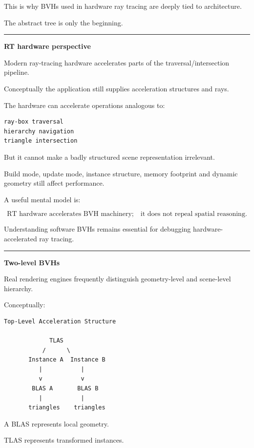 This is why BVHs used in hardware ray tracing are deeply tied to architecture.

The abstract tree is only the beginning.

\begin{center}\rule{0.5\linewidth}{0.5pt}\end{center}

\textbf{RT hardware perspective}

Modern ray-tracing hardware accelerates parts of the traversal/intersection pipeline.

Conceptually the application still supplies acceleration structures and rays.

The hardware can accelerate operations analogous to:

\begin{verbatim}
ray-box traversal
hierarchy navigation
triangle intersection
\end{verbatim}

But it cannot make a badly structured scene representation irrelevant.

Build mode, update mode, instance structure, memory footprint and dynamic geometry still affect performance.

A useful mental model is:

\[
\boxed{
\text{RT hardware accelerates BVH machinery;}
\quad
\text{it does not repeal spatial reasoning.}
}
\]

Understanding software BVHs remains essential for debugging hardware-accelerated ray tracing.

\begin{center}\rule{0.5\linewidth}{0.5pt}\end{center}

\textbf{Two-level BVHs}

Real rendering engines frequently distinguish geometry-level and scene-level hierarchy.

Conceptually:

\begin{verbatim}
Top-Level Acceleration Structure

             TLAS
           /      \
       Instance A  Instance B
          |           |
          v           v
        BLAS A       BLAS B
          |           |
       triangles    triangles
\end{verbatim}

A BLAS represents local geometry.

TLAS represents transformed instances.

